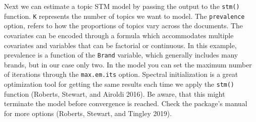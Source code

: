 Next we can estimate a topic STM model by passing the output to the
\texttt{stm()} function. \texttt{K} represents the number of topics we
want to model. The \texttt{prevalence} option, refers to how the proportions of topics
vary across the documents. The covariates can be encoded through
a formula which accommodates multiple covariates and variables that can
be factorial or continuous. In this example, prevalence is a function
of the \texttt{Brand} variable, which generally includes many brands,
but in our case only two. In the model you can set the maximum number of
iterations through the \texttt{max.em.its} option. Spectral
initialization is a great optimization tool for getting the same
results each time we apply the \texttt{stm()} function (Roberts,
Stewart, and Airoldi 2016). Be aware, that this might terminate the
model before convergence is reached. Check the package's manual for more
options (Roberts, Stewart, and Tingley 2019).

\begin{Shaded}
\begin{Highlighting}[]
\OtherTok{\textless{}{-}} \NormalTok{(}\SpecialCharTok{$}\SpecialCharTok{$}
                        \NormalTok{, }\SpecialCharTok{\textasciitilde{}}
                        \NormalTok{, }\SpecialCharTok{$}
                        \NormalTok{, } \NormalTok{)}
\end{Highlighting}
\end{Shaded}

